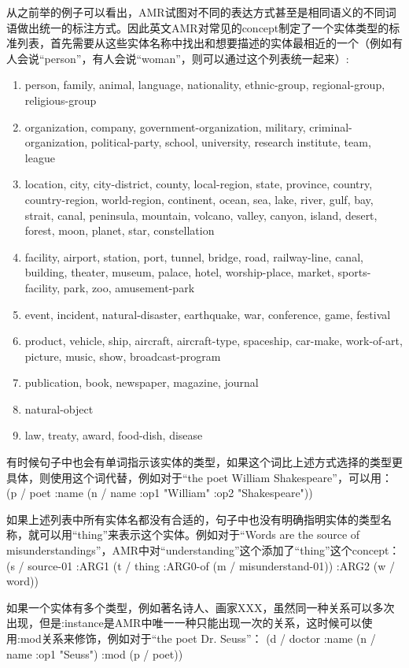 \documentclass[master, winfont]{njuthesis}
\begin{document}
从之前举的例子可以看出，AMR试图对不同的表达方式甚至是相同语义的不同词语做出统一的标注方式。因此英文AMR对常见的concept制定了一个实体类型的标准列表，首先需要从这些实体名称中找出和想要描述的实体最相近的一个（例如有人会说“person”，有人会说“woman”，则可以通过这个列表统一起来）:
\begin{enumerate}
  \item person, family, animal, language, nationality, ethnic-group, regional-group, religious-group
  \item organization, company, government-organization, military, criminal-organization, political-party, school, university, research institute, team, league
  \item location, city, city-district, county, local-region, state, province, country, country-region, world-region, continent, ocean, sea, lake, river, gulf, bay, strait, canal, peninsula, mountain, volcano, valley, canyon, island, desert, forest, moon, planet, star, constellation
  \item facility, airport, station, port, tunnel, bridge, road, railway-line, canal, building, theater, museum, palace, hotel, worship-place, market, sports-facility, park, zoo, amusement-park
  \item event, incident, natural-disaster, earthquake, war, conference, game, festival
  \item product, vehicle, ship, aircraft, aircraft-type, spaceship, car-make, work-of-art, picture, music, show, broadcast-program
  \item publication, book, newspaper, magazine, journal
  \item natural-object
  \item law, treaty, award, food-dish, disease
\end{enumerate}

有时候句子中也会有单词指示该实体的类型，如果这个词比上述方式选择的类型更具体，则使用这个词代替，例如对于“the poet William Shakespeare”，可以用：
(p / poet
	:name (n / name :op1 "William" :op2 "Shakespeare"))

如果上述列表中所有实体名都没有合适的，句子中也没有明确指明实体的类型名称，就可以用“thing”来表示这个实体。例如对于“Words are the source of misunderstandings”，AMR中对“understanding”这个添加了“thing”这个concept：
(s / source-01
      :ARG1 (t / thing
            :ARG0-of (m / misunderstand-01))
      :ARG2 (w / word))

如果一个实体有多个类型，例如著名诗人、画家XXX，虽然同一种关系可以多次出现，但是:instance是AMR中唯一一种只能出现一次的关系，这时候可以使用:mod关系来修饰，例如对于“the poet Dr. Seuss”：
(d / doctor 
	 :name (n / name 
	 	    :op1 "Seuss")
	 :mod (p / poet))
\end{document}
